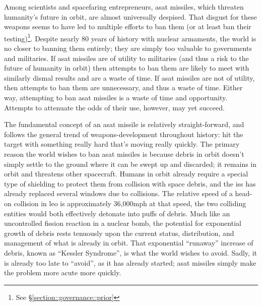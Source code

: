 
\maketitle

\pagestyle{theRest}
\thispagestyle{firstPage}



Among scientists and spacefaring entrepreneurs, \ac{asat} missiles,
which threaten humanity's future in orbit, are almost universally
despised.  That disgust for these weapons seems to have led to
multiple efforts to ban them (or at least ban their
testing)\footnote{See \S\ref{section::governance::prior}}.  Despite
nearly 80 years of history with nuclear armaments, the world is no
closer to banning them entirely; they are simply too valuable to
governments and militaries.  If \ac{asat} missiles are of utility to
militaries (and thus a risk to the future of humanity in orbit) then
attempts to ban them are likely to meet with similarly dismal results
and are a waste of time.  If \ac{asat} missiles are not of utility,
then attempts to ban them are unnecessary, and thus a waste of time.
Either way, attempting to ban \ac{asat} missiles is a waste of time
and opportunity.  Attempts to attenuate the odds of their use,
however, may yet succeed.

The fundamental concept of an \ac{asat} missile is relatively
straight-forward, and follows the general trend of weapons-development
throughout history: hit the target with something really hard that's
moving really quickly.  The primary reason the world wishes to ban
\ac{asat} missiles is because debris in orbit doesn't simply settle to
the ground where it can be swept up and discarded; it remains in orbit
and threatens other spacecraft.  Humans in orbit already require a
special type of shielding to protect them from collision with space
debris, and the \ac{iss} has already replaced several windows due to
collisions.  The relative speed of a head-on collision in \ac{leo} is
approximately 36,000mph at that speed, the two colliding entities
would both effectively detonate into puffs of debris.  Much like an
uncontrolled fission reaction in a nuclear bomb, the potential for
exponential growth of debris rests tenuously upon the current status,
distribution, and management of what is already in orbit.  That
exponential ``runaway'' increase of debris, known as ``Kessler
Syndrome'', is what the world wishes to avoid.  Sadly, it is already
too late to ``avoid'', as it has already started; \ac{asat} missiles
simply make the problem more acute more quickly.

